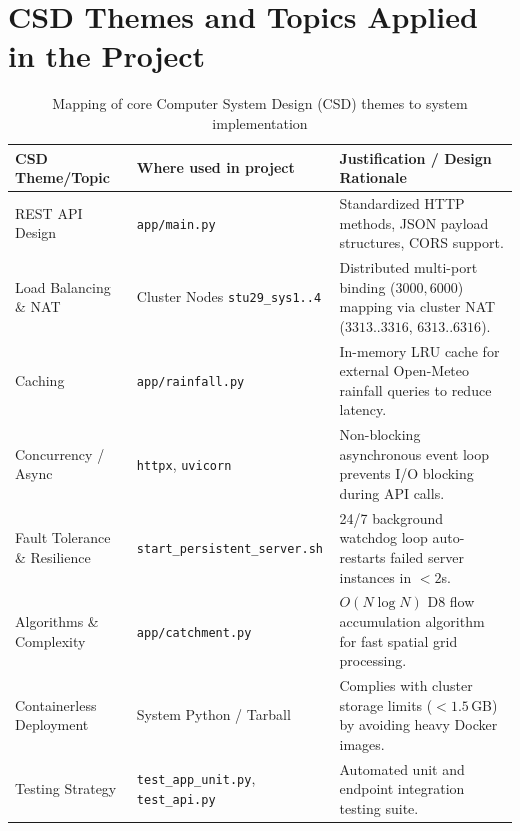 \documentclass[11pt,a4paper]{article}
\begin{document}
\section{CSD Themes and Topics Applied in the Project}
\label{sec:csd-themes}

\begin{table}[t]
\centering
\caption{Mapping of core Computer System Design (CSD) themes to system implementation}
\label{tab:csd-themes}
\vspace{0.2cm}
\begin{tabular}{p{4.0cm}p{4.5cm}p{6.5cm}}
\toprule
\textbf{CSD Theme/Topic} & \textbf{Where used in project} & \textbf{Justification / Design Rationale} \\
\midrule
REST API Design & \texttt{app/main.py} & Standardized HTTP methods, JSON payload structures, CORS support. \\
Load Balancing \& NAT & Cluster Nodes \texttt{stu29\_sys1..4} & Distributed multi-port binding ($3000, 6000$) mapping via cluster NAT ($3313..3316$, $6313..6316$). \\
Caching & \texttt{app/rainfall.py} & In-memory LRU cache for external Open-Meteo rainfall queries to reduce latency. \\
Concurrency / Async & \texttt{httpx}, \texttt{uvicorn} & Non-blocking asynchronous event loop prevents I/O blocking during API calls. \\
Fault Tolerance \& Resilience & \texttt{start\_persistent\_server.sh} & 24/7 background watchdog loop auto-restarts failed server instances in $<2$s. \\
Algorithms \& Complexity & \texttt{app/catchment.py} & $O(N \log N)$ D8 flow accumulation algorithm for fast spatial grid processing. \\
Containerless Deployment & System Python / Tarball & Complies with cluster storage limits ($<1.5$\,GB) by avoiding heavy Docker images. \\
Testing Strategy & \texttt{test\_app\_unit.py}, \texttt{test\_api.py} & Automated unit and endpoint integration testing suite. \\
\bottomrule
\end{tabular}
\end{table}
\end{document}
